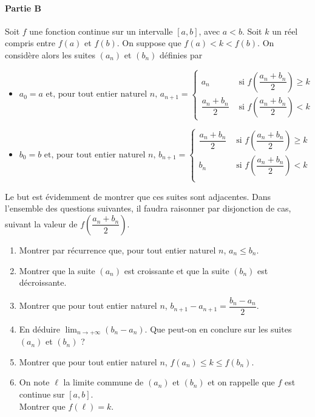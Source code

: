 \documentclass[11pt,fleqn, openany]{book} %
\begin{document}
\begin{exercise}[subtitle={(Démontrer le théorème des valeurs intermédiaires)}]
\paragraph{Partie B}

Soit $f$ une fonction continue sur un intervalle $[a,b]$, avec $a<b$. Soit $k$ un réel compris entre $f(a)$ et $f(b)$. On suppose que $f(a) < k < f(b)$. On considère alors les suites $(a_n)$ et $(b_n)$ définies par

\begin{itemize}
\item $ a_0 = a 
\text{ et, pour tout entier naturel }n,\, a_{n+1} = \left\{ \begin{array}{ll} a_n& \text{ si } f\left(\dfrac{a_n+b_n}{2}\right) \geqslant k \\ \dfrac{a_n +b_n}{2} &\text{ si } f\left(\dfrac{a_n+b_n}{2}\right) < k \end{array}\right.$
\vskip5pt
\item $ b_0 = b
\text{ et, pour tout entier naturel }n,\, b_{n+1} = \left\{ \begin{array}{ll} \dfrac{a_n +b_n}{2} & \text{ si } f\left(\dfrac{a_n+b_n}{2}\right) \geqslant k \\
b_n &\text{ si } f\left(\dfrac{a_n+b_n}{2}\right) < k \\  \end{array}\right.$
\end{itemize}

Le but est évidemment de montrer que ces suites sont adjacentes. Dans l'ensemble des questions suivantes, il faudra raisonner par disjonction de cas, suivant la valeur de $f\left(\dfrac{a_n+b_n}{2}\right)$.

\begin{enumerate}
\item Montrer par récurrence que, pour tout entier naturel $n$, $a_n \leqslant b_n$. 
\item Montrer que la suite $(a_n)$ est croissante et que la suite $(b_n)$ est décroissante.
\item Montrer que pour tout entier naturel $n$, $b_{n+1}-a_{n+1}=\dfrac{b_n-a_n}{2}$.
\item En déduire $\displaystyle\lim_{n \to + \infty}(b_n-a_n)$. Que peut-on en conclure sur les suites $(a_n)$ et $(b_n)$ ?
\item Montrer que pour tout entier naturel $n$, $f(a_n) \leqslant k \leqslant f(b_n)$.
\item On note $\ell$ la limite commune de $(a_n)$ et $(b_n)$ et on rappelle que $f$ est continue sur $[a,b]$.\\ Montrer que $f(\ell)=k$.
\end{enumerate}

\end{exercise}
\end{document}
